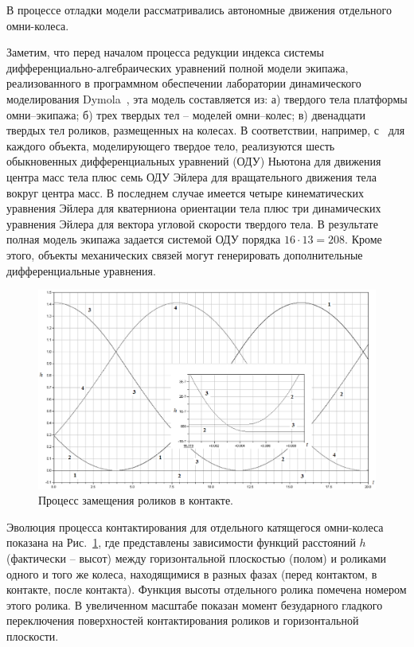 В процессе отладки модели рассматривались автономные движения отдельного 
омни-колеса.

Заметим, что перед началом процесса редукции индекса системы 
дифференциально-алгебраических уравнений полной модели экипажа, реализованного
в программном обеспечении лаборатории динамического моделирования 
Dymola~\cite{Dymola}, эта модель составляется из: а) твердого тела платформы
омни--экипажа; б) трех твердых тел -- моделей омни--колес; в) двенадцати 
твердых тел роликов, размещенных на колесах. В соответствии, например, 
с~\cite{Kosenko2007} для каждого объекта, моделирующего твердое тело, 
реализуются шесть обыкновенных дифференциальных уравнений (ОДУ) Ньютона для
движения центра масс тела плюс семь ОДУ Эйлера для вращательного движения тела
вокруг центра масс. В последнем случае имеется четыре кинематических уравнения
Эйлера для кватерниона ориентации тела плюс три динамических уравнения Эйлера
для вектора угловой скорости твердого тела. В результате полная модель экипажа
задается системой ОДУ порядка $16\cdot 13=208$. Кроме этого, объекты 
механических связей могут генерировать дополнительные дифференциальные 
уравнения.

\begin{figure}[htb]
\centerline{\includegraphics[width=15cm]{content/parts/3_friction/nd/Figure11.eps}}
\caption{Процесс замещения роликов в контакте.}
\label{fig1}
\end{figure}

Эволюция процесса контактирования для отдельного катящегося омни-колеса 
показана на Рис.~\ref{fig1}, где представлены зависимости функций расстояний 
$h$ (фактически -- высот) между горизонтальной плоскостью (полом) и роликами 
одного и того же колеса, находящимися в разных фазах (перед контактом, в 
контакте, после контакта). Функция высоты отдельного ролика помечена номером 
этого ролика. В увеличенном масштабе показан момент безударного гладкого 
переключения поверхностей контактирования роликов и горизонтальной плоскости.

